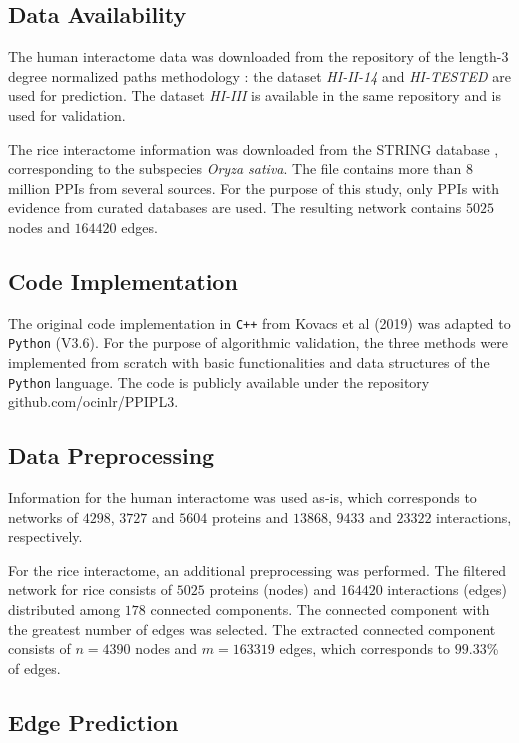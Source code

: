 \subsection*{Data Availability}

The human interactome data was downloaded from the repository of the
length-3 degree normalized paths methodology \cite{Kovacs2019}: the
dataset \emph{HI-II-14} and \emph{HI-TESTED} are used for prediction.
The dataset \emph{HI-III} is available in the same repository and
is used for validation.

The rice interactome information was downloaded from the STRING database
\cite{Szklarczyk2019}, corresponding to the subspecies \emph{Oryza
sativa}. The file contains more than 8 million PPIs from several sources.
For the purpose of this study, only PPIs with evidence from curated
databases are used. The resulting network contains $5025$ nodes and
$164420$ edges.

\subsection*{Code Implementation}

The original code implementation in \texttt{C++} from Kovacs et al
(2019) was adapted to \texttt{Python} (V3.6). For the purpose of algorithmic
validation, the three methods were implemented from scratch with basic
functionalities and data structures of the \texttt{Python} language.
The code is publicly available under the repository github.com/ocinlr/PPIPL3.

\subsection*{Data Preprocessing}

Information for the human interactome was used as-is, which corresponds
to networks of $4298$, $3727$ and $5604$ proteins and $13868$,
$9433$ and $23322$ interactions, respectively.

For the rice interactome, an additional preprocessing was performed.
The filtered network for rice consists of $5025$ proteins (nodes)
and $164420$ interactions (edges) distributed among $178$ connected
components. The connected component with the greatest number of edges
was selected. The extracted connected component consists of $n=4390$
nodes and $m=163319$ edges, which corresponds to $99.33$\% of edges.

\subsection*{Edge Prediction}


